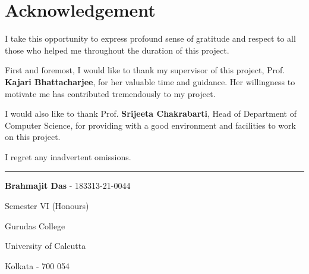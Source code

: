 \section*{\hfill \Huge Acknowledgement \hfill}%
\label{sec:Acknowledgement}


\vspace{3cm}

\onehalfspacing

I take this opportunity to express profound sense of gratitude and respect to
all those who helped me throughout the duration of this project.

\vspace{1cm}

First and foremost, I would like to thank my supervisor of this project, Prof.
\textbf{Kajari Bhattacharjee}, for her valuable time and guidance. Her
willingness to motivate me has contributed tremendously to my project.

\vspace{1cm}

I would also like to thank Prof. \textbf{Srijeeta Chakrabarti}, Head of
Department of Computer Science, for providing with a good environment and
facilities to work on this project.

\vspace{1cm}

I regret any inadvertent omissions.

\vfill

\rule{7cm}{0.4pt}

\textbf{Brahmajit Das} - 183313-21-0044

Semester VI (Honours)

Gurudas College

University of Calcutta

Kolkata - 700 054

\singlespacing
